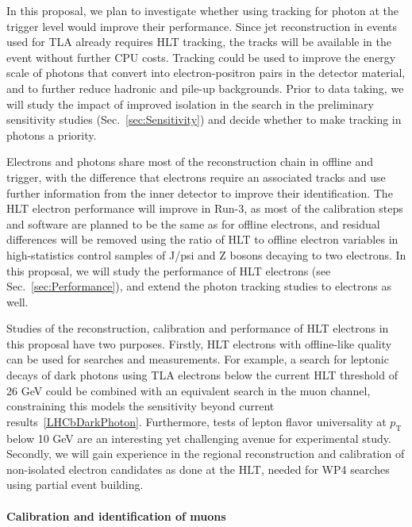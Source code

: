 In this proposal, we plan to investigate whether using tracking for photon at the trigger level would improve their performance. Since jet reconstruction in events used for TLA already requires HLT tracking, the tracks will be available in the event without further CPU costs. Tracking could be used to improve the energy scale of photons that convert into electron-positron pairs in the detector material, and to further reduce hadronic and pile-up backgrounds. Prior to data taking, we will study the impact of improved isolation in the search in the preliminary sensitivity studies (Sec.~\ref{sec:Sensitivity}) and decide whether to make tracking in photons a priority. 

Electrons and photons share most of the reconstruction chain in offline and trigger, with the difference that electrons require an associated tracks and use further information from the inner detector to improve their identification. The HLT electron performance will improve in Run-3, as most of the calibration steps and software are planned to be the same as for offline electrons, and residual differences will be removed using the ratio of HLT to offline electron variables in high-statistics control samples of J/psi and Z bosons decaying to two electrons. 
In this proposal, we will study the performance of HLT electrons (see Sec.~\ref{sec:Performance}), and extend the photon tracking studies to electrons as well.

Studies of the reconstruction, calibration and performance of HLT electrons in this proposal have two purposes. 
Firstly, HLT electrons with offline-like quality can be used for searches and measurements. For example, a search for leptonic decays of dark photons using TLA electrons below the current HLT threshold of 26 GeV could be combined with an equivalent search in the muon channel, constraining this models the sensitivity beyond current results~\ref{LHCbDarkPhoton}. Furthermore, tests of lepton flavor universality at $p_{\mathrm{T}}$ below 10 GeV are an interesting yet challenging avenue for experimental study. 
Secondly, we will gain experience in the regional reconstruction and calibration of non-isolated electron candidates as done at the HLT, needed for WP4 searches using partial event building. 

\paragraph{Calibration and identification of muons} 

